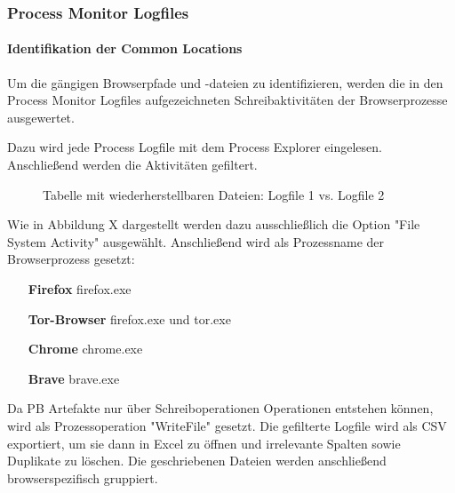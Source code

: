 \subsubsection*{Process Monitor Logfiles}


\paragraph*{Identifikation der Common Locations}
Um die gängigen Browserpfade und -dateien zu identifizieren, werden die in den Process Monitor Logfiles aufgezeichneten Schreibaktivitäten der Browserprozesse ausgewertet.

Dazu wird jede Process Logfile mit dem Process Explorer eingelesen. Anschließend werden die Aktivitäten gefiltert.
\begin{figure}[h!]
	\centerline{}
	\caption{Tabelle mit wiederherstellbaren Dateien: Logfile 1 vs. Logfile 2}
\end{figure}
Wie in Abbildung X dargestellt werden dazu ausschließlich die Option "File System Activity" ausgewählt.
Anschließend wird als Prozessname der Browserprozess gesetzt:
\begin{itemize}
\item[\textbf{Firefox}] firefox.exe
\item[\textbf{Tor-Browser}] firefox.exe und tor.exe
\item[\textbf{Chrome}] chrome.exe
\item[\textbf{Brave}] brave.exe
\end{itemize}
Da PB Artefakte nur über Schreiboperationen Operationen entstehen können, wird als Prozessoperation "WriteFile" gesetzt.
Die gefilterte Logfile wird als CSV exportiert, um sie dann in Excel zu öffnen und irrelevante Spalten sowie Duplikate zu löschen.
Die geschriebenen Dateien werden anschließend browserspezifisch gruppiert.

